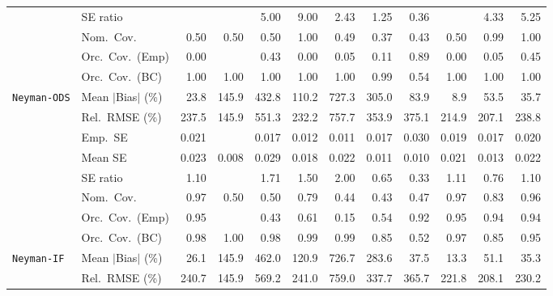 \begin{landscape}
\begin{longtable}{llrrrrrrrrrr}
 & SE ratio &  &  & 5.00 & 9.00 & \cellcolor{rankthree}2.43 & \cellcolor{rankone}1.25 & \cellcolor{ranktwo}0.36 &  & 4.33 & 5.25 \\
 & Nom.\ Cov. & 0.50 & 0.50 & 0.50 & \cellcolor{ranktwo}1.00 & 0.49 & 0.37 & 0.43 & 0.50 & \cellcolor{rankone}0.99 & \cellcolor{rankthree}1.00 \\
 & Orc.\ Cov.\ (Emp) & 0.00 &  & \cellcolor{rankthree}0.43 & 0.00 & 0.05 & 0.11 & \cellcolor{rankone}0.89 & 0.00 & 0.05 & \cellcolor{ranktwo}0.45 \\
 & Orc.\ Cov.\ (BC) & \cellcolor{ranktwo}1.00 & \cellcolor{rankthree}1.00 & 1.00 & 1.00 & 1.00 & \cellcolor{rankone}0.99 & 0.54 & 1.00 & 1.00 & 1.00 \\
\addlinespace[2pt]
\quad \texttt{Neyman-ODS} & Mean $|$Bias$|$ (\%) & \cellcolor{ranktwo}23.8 & 145.9 & 432.8 & 110.2 & 727.3 & 305.0 & 83.9 & \cellcolor{rankone}8.9 & 53.5 & \cellcolor{rankthree}35.7 \\
 & Rel.\ RMSE (\%) & 237.5 & \cellcolor{rankone}145.9 & 551.3 & 232.2 & 757.7 & 353.9 & 375.1 & \cellcolor{rankthree}214.9 & \cellcolor{ranktwo}207.1 & 238.8 \\
 & Emp.\ SE & 0.021 &  & 0.017 & 0.012 & 0.011 & 0.017 & 0.030 & 0.019 & 0.017 & 0.020 \\
 & Mean SE & 0.023 & 0.008 & 0.029 & 0.018 & 0.022 & 0.011 & 0.010 & 0.021 & 0.013 & 0.022 \\
 & SE ratio & \cellcolor{rankone}1.10 &  & 1.71 & 1.50 & 2.00 & 0.65 & 0.33 & \cellcolor{rankthree}1.11 & 0.76 & \cellcolor{ranktwo}1.10 \\
 & Nom.\ Cov. & \cellcolor{rankthree}0.97 & 0.50 & 0.50 & 0.79 & 0.44 & 0.43 & 0.47 & \cellcolor{ranktwo}0.97 & 0.83 & \cellcolor{rankone}0.96 \\
 & Orc.\ Cov.\ (Emp) & \cellcolor{rankone}0.95 &  & 0.43 & 0.61 & 0.15 & 0.54 & 0.92 & \cellcolor{ranktwo}0.95 & 0.94 & \cellcolor{rankthree}0.94 \\
 & Orc.\ Cov.\ (BC) & \cellcolor{rankthree}0.98 & 1.00 & 0.98 & 0.99 & 0.99 & 0.85 & 0.52 & \cellcolor{ranktwo}0.97 & 0.85 & \cellcolor{rankone}0.95 \\
\addlinespace[2pt]
\quad \texttt{Neyman-IF} & Mean $|$Bias$|$ (\%) & \cellcolor{ranktwo}26.1 & 145.9 & 462.0 & 120.9 & 726.7 & 283.6 & 37.5 & \cellcolor{rankone}13.3 & 51.1 & \cellcolor{rankthree}35.3 \\
 & Rel.\ RMSE (\%) & 240.7 & \cellcolor{rankone}145.9 & 569.2 & 241.0 & 759.0 & 337.7 & 365.7 & \cellcolor{rankthree}221.8 & \cellcolor{ranktwo}208.1 & 230.2 \\

\end{longtable}
\end{landscape}
